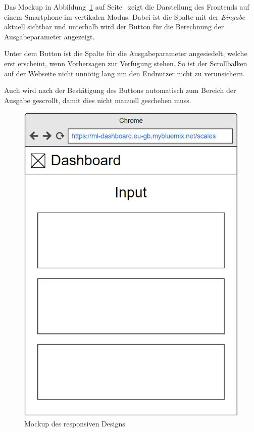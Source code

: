 Das Mockup in Abbildung~\ref{fig:umsetzung_mockup_scale_responsive} auf Seite~\pageref{fig:umsetzung_mockup_scale_responsive}
zeigt die Darstellung des Frontends auf einem Smartphone im vertikalen Modus. Dabei ist die Spalte mit der
\textit{Eingabe} aktuell sichtbar und unterhalb wird der Button für die Berechnung der Ausgabeparameter angezeigt.

Unter dem Button ist die Spalte für die Ausgabeparameter angesiedelt, welche erst erscheint, wenn Vorhersagen zur
Verfügung stehen. So ist der Scrollbalken auf der Webseite nicht unnötig lang um den Endnutzer nicht zu verunsichern.

Auch wird nach der Bestätigung des Buttons automatisch zum Bereich der Ausgabe gescrollt, damit dies nicht manuell
geschehen muss.

\begin{figure}[h]
    \centering
    \includegraphics[scale=0.45]{images/kapitel_4/mockup_scale_responsive.png}
    \caption{Mockup des responsiven Designs}
    \label{fig:umsetzung_mockup_scale_responsive}
\end{figure}

